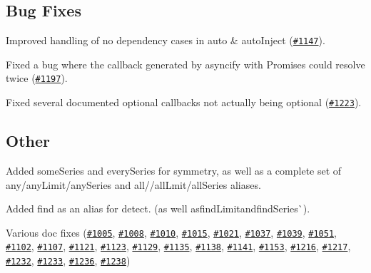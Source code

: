 \subsection*{Bug Fixes}


\begin{DoxyItemize}
\item Improved handling of no dependency cases in {\ttfamily auto} \& {\ttfamily auto\+Inject} (\href{https://github.com/caolan/async/issues/1147}{\tt \#1147}).
\item Fixed a bug where the callback generated by {\ttfamily asyncify} with {\ttfamily Promises} could resolve twice (\href{https://github.com/caolan/async/issues/1197}{\tt \#1197}).
\item Fixed several documented optional callbacks not actually being optional (\href{https://github.com/caolan/async/issues/1223}{\tt \#1223}).
\end{DoxyItemize}

\subsection*{Other}


\begin{DoxyItemize}
\item Added {\ttfamily some\+Series} and {\ttfamily every\+Series} for symmetry, as well as a complete set of {\ttfamily any}/{\ttfamily any\+Limit}/{\ttfamily any\+Series} and {\ttfamily all}/{\ttfamily /all\+Lmit}/{\ttfamily all\+Series} aliases.
\item Added {\ttfamily find} as an alias for {\ttfamily detect. (as well as}find\+Limit{\ttfamily and}find\+Series\`{}).
\item Various doc fixes (\href{https://github.com/caolan/async/issues/1005}{\tt \#1005}, \href{https://github.com/caolan/async/issues/1008}{\tt \#1008}, \href{https://github.com/caolan/async/issues/1010}{\tt \#1010}, \href{https://github.com/caolan/async/issues/1015}{\tt \#1015}, \href{https://github.com/caolan/async/issues/1021}{\tt \#1021}, \href{https://github.com/caolan/async/issues/1037}{\tt \#1037}, \href{https://github.com/caolan/async/issues/1039}{\tt \#1039}, \href{https://github.com/caolan/async/issues/1051}{\tt \#1051}, \href{https://github.com/caolan/async/issues/1102}{\tt \#1102}, \href{https://github.com/caolan/async/issues/1107}{\tt \#1107}, \href{https://github.com/caolan/async/issues/1121}{\tt \#1121}, \href{https://github.com/caolan/async/issues/1123}{\tt \#1123}, \href{https://github.com/caolan/async/issues/1129}{\tt \#1129}, \href{https://github.com/caolan/async/issues/1135}{\tt \#1135}, \href{https://github.com/caolan/async/issues/1138}{\tt \#1138}, \href{https://github.com/caolan/async/issues/1141}{\tt \#1141}, \href{https://github.com/caolan/async/issues/1153}{\tt \#1153}, \href{https://github.com/caolan/async/issues/1216}{\tt \#1216}, \href{https://github.com/caolan/async/issues/1217}{\tt \#1217}, \href{https://github.com/caolan/async/issues/1232}{\tt \#1232}, \href{https://github.com/caolan/async/issues/1233}{\tt \#1233}, \href{https://github.com/caolan/async/issues/1236}{\tt \#1236}, \href{https://github.com/caolan/async/issues/1238}{\tt \#1238})
\end{DoxyItemize}

